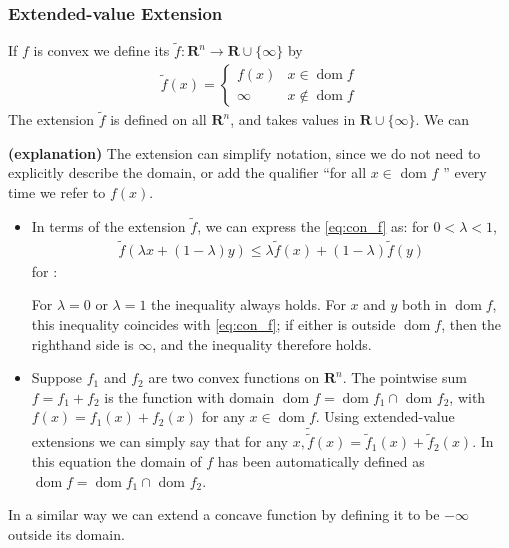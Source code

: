 \documentclass{article}
\newcommand{\bfs}[1]{\textbf{({#1}) }}
\newcommand{\dom}{\operatorname{dom}}
\begin{document}
\subsubsection{Extended-value Extension}
If $f$ is convex we define its  $\tilde{f}: \mathbf{R}^{n} \rightarrow \mathbf{R} \cup\{\infty\}$ by
\begin{align*}
\tilde{f}(x)= \begin{cases}f(x) & x \in \dom  f \\ \infty & x \notin \dom  f\end{cases}
\end{align*}
The extension $\tilde{f}$ is defined on all $\mathbf{R}^{n}$, and takes values in $\mathbf{R} \cup\{\infty\}$. We can 
\begin{rema}{\bfs{explanation}}
The extension can simplify notation, since we do not need to explicitly describe the domain, or add the qualifier ``for all $x \in$ dom $f$ '' every time we refer to $f(x)$.  
\begin{itemize}
    \item In terms of the extension $\tilde{f}$, we can express the \cref{eq:con_f} as: for $0<\lambda<1$,
\begin{align*}
\tilde{f}(\lambda x+(1-\lambda) y) \leq \lambda \tilde{f}(x)+(1-\lambda) \tilde{f}(y)
\end{align*}
for :

For $\lambda=0$ or $\lambda=1$ the inequality always holds. For $x$ and $y$ both in $\dom  f$, this inequality coincides with \cref{eq:con_f}; if either is outside $\dom  f$, then the righthand side is $\infty$, and the inequality therefore holds.
\item Suppose $f_{1}$ and $f_{2}$ are two convex functions on $\mathbf{R}^{n}$. The pointwise sum $f=f_{1}+f_{2}$ is the function with domain $\dom  f=\dom  f_{1} \cap$ dom $f_{2}$, with $f(x)=f_{1}(x)+f_{2}(x)$ for any $x \in \dom  f$. Using extended-value extensions we can simply say that for any $x, \tilde{\tilde{f}}(x)=\tilde{f}_{1}(x)+\tilde{f}_{2}(x)$. In this equation the domain of $f$ has been automatically defined as $\dom  f=\dom  f_{1} \cap$ dom $f_{2}$.
\end{itemize} 
\end{rema}
In a similar way we can extend a concave function by defining it to be $-\infty$ outside its domain.
\end{document}
